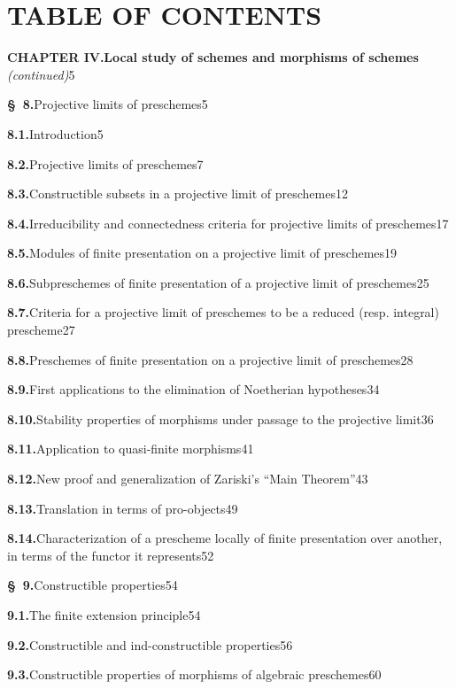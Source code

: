 \let\EGAIVthreeTerm\relax
\endgroup

\clearpage
\thispagestyle{empty}
\null

\clearpage
{}
{}
\section*{TABLE OF CONTENTS}

\begingroup
\small
\setlength{\parindent}{0pt}
\setlength{\parskip}{1.5pt}
\newcommand{\EGAIVthreeContentsLine}[3]{\textbf{#1}\quad #2\unskip\nobreak\hspace{0.4em}\nobreak\dotfill\nobreak\mbox{#3}\par}

\EGAIVthreeContentsLine{CHAPTER IV.}{\textbf{Local study of schemes and morphisms of schemes} \emph{(continued)}}{5}
\EGAIVthreeContentsLine{\S~8.}{Projective limits of preschemes}{5}
\EGAIVthreeContentsLine{8.1.}{Introduction}{5}
\EGAIVthreeContentsLine{8.2.}{Projective limits of preschemes}{7}
\EGAIVthreeContentsLine{8.3.}{Constructible subsets in a projective limit of preschemes}{12}
\EGAIVthreeContentsLine{8.4.}{Irreducibility and connectedness criteria for projective limits of preschemes}{17}
\EGAIVthreeContentsLine{8.5.}{Modules of finite presentation on a projective limit of preschemes}{19}
\EGAIVthreeContentsLine{8.6.}{Subpreschemes of finite presentation of a projective limit of preschemes}{25}
\EGAIVthreeContentsLine{8.7.}{Criteria for a projective limit of preschemes to be a reduced (resp. integral) prescheme}{27}
\EGAIVthreeContentsLine{8.8.}{Preschemes of finite presentation on a projective limit of preschemes}{28}
\EGAIVthreeContentsLine{8.9.}{First applications to the elimination of Noetherian hypotheses}{34}
\EGAIVthreeContentsLine{8.10.}{Stability properties of morphisms under passage to the projective limit}{36}
\EGAIVthreeContentsLine{8.11.}{Application to quasi-finite morphisms}{41}
\EGAIVthreeContentsLine{8.12.}{New proof and generalization of Zariski's ``Main Theorem''}{43}
\EGAIVthreeContentsLine{8.13.}{Translation in terms of pro-objects}{49}
\EGAIVthreeContentsLine{8.14.}{Characterization of a prescheme locally of finite presentation over another, in terms of the functor it represents}{52}

\EGAIVthreeContentsLine{\S~9.}{Constructible properties}{54}
\EGAIVthreeContentsLine{9.1.}{The finite extension principle}{54}
\EGAIVthreeContentsLine{9.2.}{Constructible and ind-constructible properties}{56}
\EGAIVthreeContentsLine{9.3.}{Constructible properties of morphisms of algebraic preschemes}{60}

